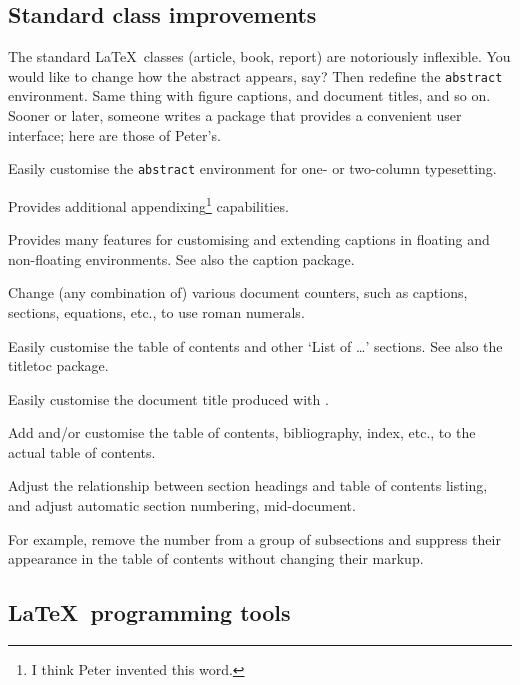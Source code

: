 \documentclass{ltugboat}
\begin{document}
\subsection{Standard class improvements}

The standard \LaTeX\ classes (\textsf{article}, \textsf{book}, \textsf{report}) are notoriously inflexible. You would like to change how the abstract appears, say? Then redefine the \texttt{abstract} environment. Same thing with figure captions, and document titles, and so on. Sooner or later, someone writes a package that provides a convenient user interface; here are those of Peter's.

\begin{description}[font=\normalfont\sffamily]
\item [abstract] Easily customise the \texttt{abstract} environment for one- or two-column typesetting.
\item [appendix] Provides additional appendixing\footnote{I think Peter invented this word.} capabilities.
\item [ccaption] Provides many features for customising and extending captions in floating and non-floating environments. See also the \textsf{caption} package.
\item [romannum] Change (any combination of) various document counters, such as captions, sections, equations, etc., to use roman numerals.
\item [tocloft] Easily customise the table of contents and other `List of \dots' sections. See also the \textsf{titletoc} package.
\item [titling] Easily customise the document title produced with .
\item [tocbibind] Add and/or customise the table of contents, bibliography, index, etc., to the actual table of contents.
\item [tocvsec2] Adjust the relationship between section headings and table of contents listing, and adjust automatic section numbering, mid-document.

For example, remove the number from a group of subsections and suppress their appearance in the table of contents without changing their markup.
\end{description}

\subsection{\LaTeX\ programming tools}
\end{document}
